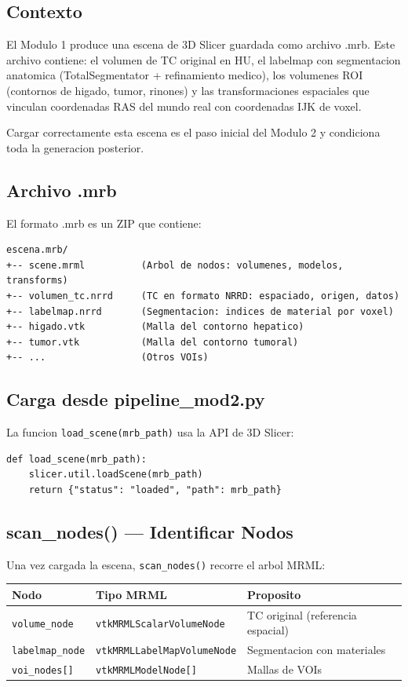 \documentclass[12pt,a4paper]{article}
\begin{document}
\subsection{Contexto}

El Modulo 1 produce una escena de 3D Slicer guardada como archivo .mrb. Este archivo contiene: el volumen de TC original en HU, el labelmap con segmentacion anatomica (TotalSegmentator + refinamiento medico), los volumenes ROI (contornos de higado, tumor, rinones) y las transformaciones espaciales que vinculan coordenadas RAS del mundo real con coordenadas IJK de voxel.

Cargar correctamente esta escena es el paso inicial del Modulo 2 y condiciona toda la generacion posterior.

\subsection{Archivo .mrb}

El formato .mrb es un ZIP que contiene:

\begin{verbatim}
escena.mrb/
+-- scene.mrml          (Arbol de nodos: volumenes, modelos, transforms)
+-- volumen_tc.nrrd     (TC en formato NRRD: espaciado, origen, datos)
+-- labelmap.nrrd       (Segmentacion: indices de material por voxel)
+-- higado.vtk          (Malla del contorno hepatico)
+-- tumor.vtk           (Malla del contorno tumoral)
+-- ...                 (Otros VOIs)
\end{verbatim}

\subsection{Carga desde pipeline\_mod2.py}

La funcion \texttt{load\_scene(mrb\_path)} usa la API de 3D Slicer:

\begin{verbatim}
def load_scene(mrb_path):
    slicer.util.loadScene(mrb_path)
    return {"status": "loaded", "path": mrb_path}
\end{verbatim}

\subsection{scan\_nodes() --- Identificar Nodos}

Una vez cargada la escena, \texttt{scan\_nodes()} recorre el arbol MRML:

\begin{center}
\begin{tabular}{lll}
\toprule
\textbf{Nodo} & \textbf{Tipo MRML} & \textbf{Proposito} \\
\midrule
\texttt{volume\_node} & \texttt{vtkMRMLScalarVolumeNode} & TC original (referencia espacial) \\
\texttt{labelmap\_node} & \texttt{vtkMRMLLabelMapVolumeNode} & Segmentacion con materiales \\
\texttt{voi\_nodes[]} & \texttt{vtkMRMLModelNode[]} & Mallas de VOIs \\
\bottomrule
\end{tabular}
\end{center}
\end{document}
